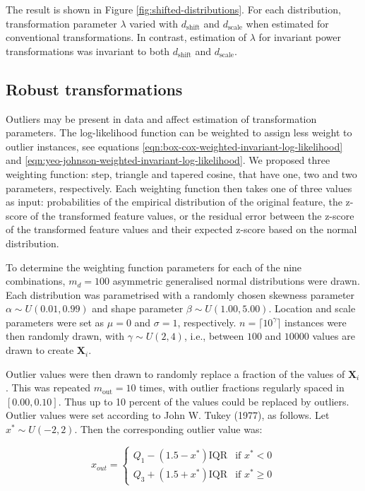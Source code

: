\documentclass[preprint,12pt,authoryear]{elsarticle}
\begin{document}
The result is shown in Figure \ref{fig:shifted-distributions}. For each
distribution, transformation parameter \(\lambda\) varied with
\(d_{\text{shift}}\) and \(d_{\text{scale}}\) when estimated for
conventional transformations. In contrast, estimation of \(\lambda\) for
invariant power transformations was invariant to both
\(d_{\text{shift}}\) and \(d_{\text{scale}}\).

\subsection{Robust transformations}\label{robust-transformations}

Outliers may be present in data and affect estimation of transformation
parameters. The log-likelihood function can be weighted to assign less
weight to outlier instances, see equations
\ref{eqn:box-cox-weighted-invariant-log-likelihood} and
\ref{eqn:yeo-johnson-weighted-invariant-log-likelihood}. We proposed
three weighting function: step, triangle and tapered cosine, that have
one, two and two parameters, respectively. Each weighting function then
takes one of three values as input: probabilities of the empirical
distribution of the original feature, the z-score of the transformed
feature values, or the residual error between the z-score of the
transformed feature values and their expected z-score based on the
normal distribution.

To determine the weighting function parameters for each of the nine
combinations, \(m_d=100\) asymmetric generalised normal distributions
were drawn. Each distribution was parametrised with a randomly chosen
skewness parameter \(\alpha \sim U\left(0.01, 0.99\right)\) and shape
parameter \(\beta \sim U\left(1.00, 5.00 \right)\). Location and scale
parameters were set as \(\mu = 0\) and \(\sigma = 1\), respectively.
\(n = \lceil 10^\gamma \rceil\) instances were then randomly drawn, with
\(\gamma \sim U\left(2, 4\right)\), i.e., between \(100\) and \(10000\)
values are drawn to create \(\mathbf{X}_i\).

Outlier values were then drawn to randomly replace a fraction of the
values of \(\mathbf{X}_i\). This was repeated \(m_{\text{out}} = 10\)
times, with outlier fractions regularly spaced in \([0.00, 0.10]\). Thus
up to 10 percent of the values could be replaced by outliers. Outlier
values were set according to John W. Tukey (1977), as follows. Let
\(x^{*} \sim U\left(-2, 2\right)\). Then the corresponding outlier value
was:

\begin{equation}
x_{out} =
\begin{cases}
Q_1 - \left(1.5 - x^{*} \right) \text{IQR} & \text{if } x^{*} < 0 \\
Q_3 + \left(1.5 + x^{*} \right) \text{IQR} & \text{if } x^{*} \geq 0
\end{cases}
\end{equation}
\end{document}
